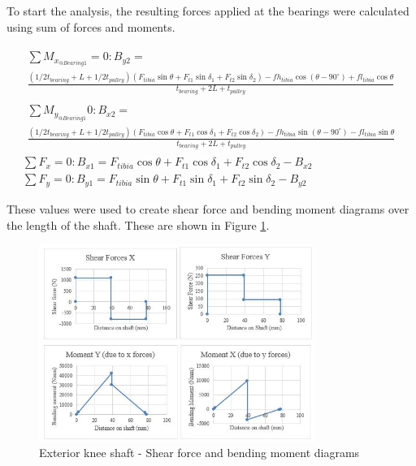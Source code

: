 To start the analysis, the resulting forces applied at the bearings were calculated using sum of forces and moments.

\begin{gather}
\begin{split}
    \sum M_{x_{@Bearing 1}}=0:  B_{y2}=
    \\
    \frac{(1/2t_{bearing}+L+1/2t_{pulley})(F_{tibia}\sin{\theta}+F_{t1}\sin{\delta_1}+F_{t2}\sin{\delta_2})-fh_{tibia}\cos{(\theta-90^{\circ})}+fl_{tibia}\cos{\theta}}{t_{bearing}+2L+t_{pulley}}
\end{split}
    \\
    \begin{split}
          \sum M_{y_{@Bearing 1}}0:  B_{x2}=
          \\
          \frac{(1/2t_{bearing}+L+1/2t_{pulley})(F_{tibia}\cos{\theta}+F_{t1}\cos{\delta_1}+F_{t2}\cos{\delta_2})-fh_{tibia}\sin{(\theta-90^{\circ})}-fl_{tibia}\sin{\theta}}{t_{bearing}+2L+t_{pulley}}  
    \end{split}
    \\
    \sum F_x=0: B_{x1}=F_{tibia}\cos{\theta}+F_{t1}\cos{\delta_1}+F_{t2}\cos{\delta_2}-B_{x2}
    \\
    \sum F_y=0: B_{y1}=F_{tibia}\sin{\theta}+F_{t1}\sin{\delta_1}+F_{t2}\sin{\delta_2}-B_{y2}
\end{gather}

These values were used to create shear force and bending moment diagrams over the length of the shaft. These are shown in Figure \ref{fig:shaft_knee_diagrams}.

\begin{figure}
    \centering
    \includegraphics[width=0.8\textwidth]{4_Analysis/img/Shafts/ShaftKneeDiagrams.JPG}
    \caption{Exterior knee shaft - Shear force and bending moment diagrams}
    \label{fig:shaft_knee_diagrams}
\end{figure}

